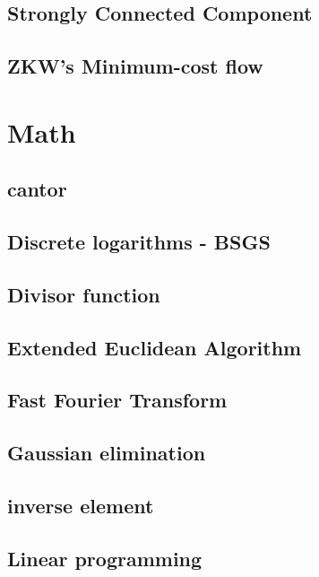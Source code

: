 \documentclass[a4paper,5pt,twocolumn,titlepage]{article}
\begin{document}
\subsection{Strongly Connected Component}

\subsection{ZKW's Minimum-cost flow}


\section{Math}
\subsection{cantor}

\subsection{Discrete logarithms - BSGS}

\subsection{Divisor function}

\subsection{Extended Euclidean Algorithm}

\subsection{Fast Fourier Transform}

\subsection{Gaussian elimination}

\subsection{inverse element}

\subsection{Linear programming}

\end{document}
